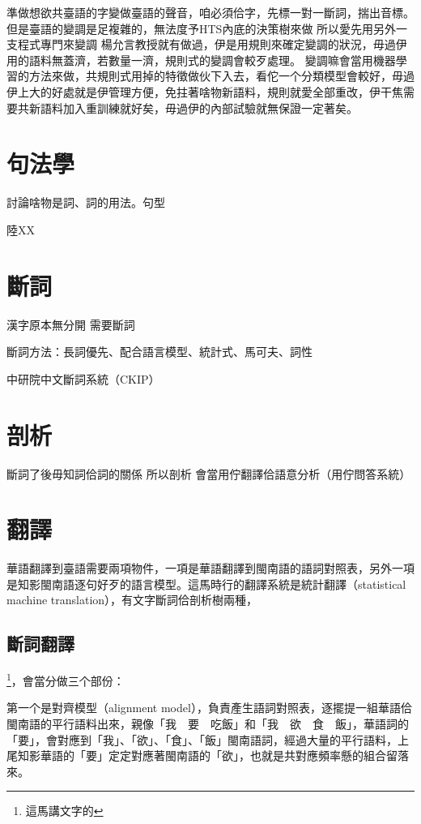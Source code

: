 \documentclass[final,oneside,onecolumn,12pt,a4paper]{book}%
\begin{document}
準做想欲共臺語的字變做臺語的聲音，咱必須佮字，先標一對一斷詞，揣出音標。
但是臺語的變調是足複雜的，無法度予HTS內底的決策樹來做
所以愛先用另外一支程式專門來變調
楊允言教授就有做過\cite{楊允言變調}，伊是用規則來確定變調的狀況，毋過伊用的語料無蓋濟，若數量一濟，規則式的變調會較歹處理。
變調嘛會當用機器學習的方法來做，共規則式用掉的特徵做伙下入去，看佗一个分類模型會較好，毋過伊上大的好處就是伊管理方便，免拄著啥物新語料，規則就愛全部重改，伊干焦需要共新語料加入重訓練就好矣，毋過伊的內部試驗就無保證一定著矣。

\section{句法學}
\label{節：句法學}
討論啥物是詞、詞的用法。句型

陸XX

\section{斷詞}
\label{節：斷詞}
漢字原本無分開
需要斷詞

斷詞方法：長詞優先、配合語言模型、統計式、馬可夫、詞性

中研院中文斷詞系統（CKIP）\cite{CKIP論文}

\section{剖析}
\label{節：剖析}
斷詞了後毋知詞佮詞的關係
所以剖析
會當用佇翻譯佮語意分析（用佇問答系統）

\section{翻譯}
\label{節：翻譯}
華語翻譯到臺語需要兩項物件，一項是華語翻譯到閩南語的語詞對照表，另外一項是知影閩南語逐句好歹的語言模型。這馬時行的翻譯系統是統計翻譯（statistical machine translation），有文字斷詞佮剖析樹兩種，
\subsection{斷詞翻譯}
\label{小節：斷詞翻譯}
\footnote{這馬講文字的}，會當分做三个部份：

第一个是對齊模型（alignment model），負責產生語詞對照表，逐擺提一組華語佮閩南語的平行語料出來，親像「我　要　吃飯」和「我　欲　食　飯」，華語詞的「要」，會對應到「我」、「欲」、「食」、「飯」閩南語詞，經過大量的平行語料，上尾知影華語的「要」定定對應著閩南語的「欲」，也就是共對應頻率懸的組合留落來。
\end{document}
